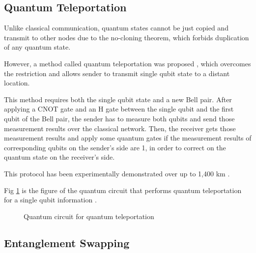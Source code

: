 \subsection{Quantum Teleportation}

Unlike classical communication, quantum states cannot be just copied and transmit to other nodes due to the no-cloning theorem, which forbids duplication of any quantum state.  

However, a method called quantum teleportation was proposed \cite{PhysRevLett.70.1895}, which overcomes the restriction and allows sender to transmit single qubit state to a distant location. 
 		
This method requires both the single qubit state and a new Bell pair. 
After applying a CNOT gate and an H gate between the single qubit and the first qubit of the Bell pair, the sender has to measure both qubits and send those measurement results over the classical network.  
Then, the receiver gets those measurement results and apply some quantum gates if the measurement results of corresponding qubits on the sender's side are 1, in order to correct on the quantum state on the receiver's side.

This protocol has been experimentally demonstrated over up to 1,400 km \cite{ren2017ground}.

Fig \ref{fig:quantum-teleporatation} is the figure of the quantum circuit that performs quantum teleportation for a single qubit information \cite{9023997}.

\begin{figure}[ht]
  	\begin{center}
	\caption{Quantum circuit for quantum teleportation}
  \label{fig:quantum-teleporatation}
	\end{center}
\end{figure}

\newpage

\subsection{Entanglement Swapping}

